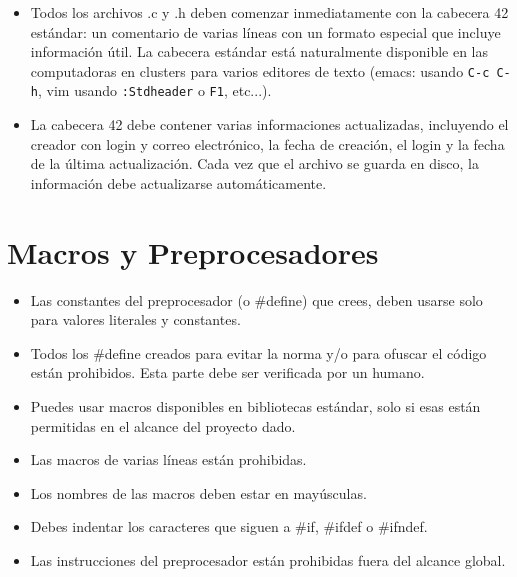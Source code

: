 \documentclass{42-es}
\begin{document}
\begin{itemize}
      \item Todos los archivos .c y .h deben comenzar inmediatamente con la
            cabecera 42 estándar: un comentario de varias líneas con un formato
            especial
            que incluye información útil. La cabecera estándar está
            naturalmente
            disponible
            en las computadoras en clusters para varios editores de texto
            (emacs:
            usando
            \texttt{C-c C-h}, vim usando \texttt{:Stdheader} o \texttt{F1},
            etc...).
      \item La cabecera 42 debe contener varias informaciones actualizadas,
            incluyendo
            el creador con login y correo electrónico, la fecha de creación, el
            login y
            la fecha de la última actualización. Cada vez que el archivo se
            guarda en
            disco, la información debe actualizarse automáticamente.
\end{itemize}
\newpage

\section{Macros y Preprocesadores}

\begin{itemize}

      \item Las constantes del preprocesador (o \#define) que crees, deben
            usarse solo para valores literales y constantes.
      \item Todos los \#define creados para evitar la norma y/o para ofuscar
            el código están prohibidos. Esta parte debe ser verificada por un
            humano.
      \item Puedes usar macros disponibles en bibliotecas estándar, solo si
            esas están permitidas en el alcance del proyecto dado.
      \item Las macros de varias líneas están prohibidas.
      \item Los nombres de las macros deben estar en mayúsculas.
      \item Debes indentar los caracteres que siguen a \#if, \#ifdef o
            \#ifndef.
      \item Las instrucciones del preprocesador están prohibidas fuera del
            alcance global.
\end{itemize}
\newpage
\end{document}
